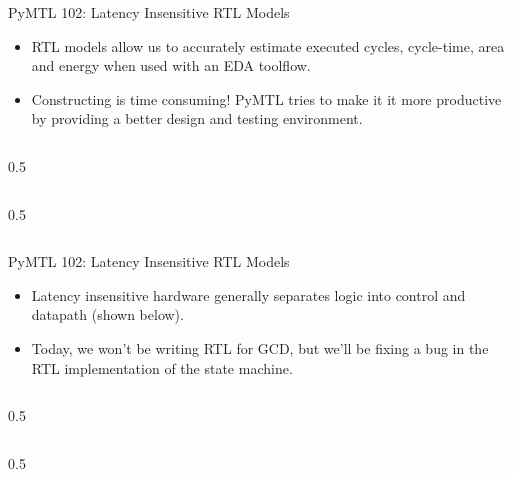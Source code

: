\begin{frame}{PyMTL 102: Latency Insensitive RTL Models}

\begin{itemize}
  \item RTL models allow us to accurately estimate executed cycles,
        cycle-time, area and energy when used with an EDA toolflow.
  \smallskip
  \item Constructing is time consuming! PyMTL tries to make it it more
        productive by providing a better design and testing environment.
\end{itemize}

  \begin{cbxcols}
  \begin{column}{0.5\tw}
  \end{column}
  \begin{column}{0.5\tw}
  \end{column}
  \end{cbxcols}
\end{frame}

\begin{frame}{PyMTL 102: Latency Insensitive RTL Models}

\begin{itemize}
  \item Latency insensitive hardware generally separates logic into
        control and datapath (shown below).
  \smallskip
  \item Today, we won't be writing RTL for GCD, but we’ll be fixing a bug
        in the RTL implementation of the state machine.
\end{itemize}

  \begin{cbxcols}
  \begin{column}{0.5\tw}
  \end{column}
  \begin{column}{0.5\tw}
  \end{column}
  \end{cbxcols}
\end{frame}


